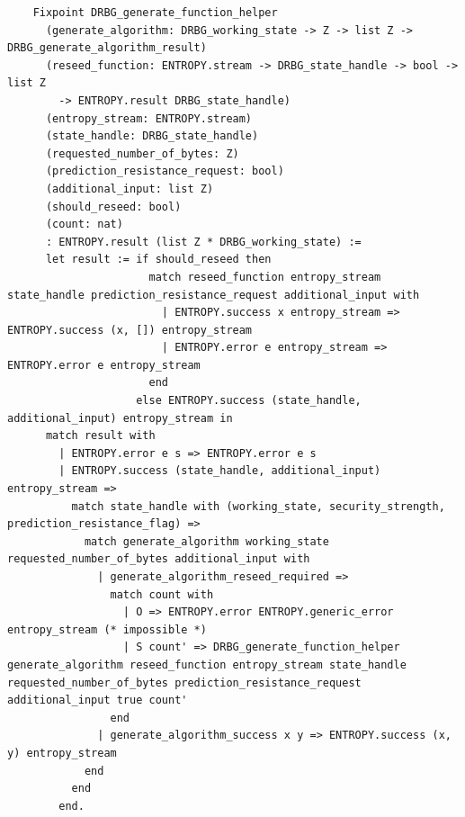 \documentclass[pageno]{jpaper}
\begin{document}
\begin{lstlisting}
    Fixpoint DRBG_generate_function_helper
      (generate_algorithm: DRBG_working_state -> Z -> list Z -> DRBG_generate_algorithm_result)
      (reseed_function: ENTROPY.stream -> DRBG_state_handle -> bool -> list Z
        -> ENTROPY.result DRBG_state_handle)
      (entropy_stream: ENTROPY.stream)
      (state_handle: DRBG_state_handle)
      (requested_number_of_bytes: Z)
      (prediction_resistance_request: bool)
      (additional_input: list Z)
      (should_reseed: bool)
      (count: nat)
      : ENTROPY.result (list Z * DRBG_working_state) :=
      let result := if should_reseed then
                      match reseed_function entropy_stream state_handle prediction_resistance_request additional_input with
                        | ENTROPY.success x entropy_stream => ENTROPY.success (x, []) entropy_stream
                        | ENTROPY.error e entropy_stream => ENTROPY.error e entropy_stream
                      end
                    else ENTROPY.success (state_handle, additional_input) entropy_stream in
      match result with
        | ENTROPY.error e s => ENTROPY.error e s
        | ENTROPY.success (state_handle, additional_input) entropy_stream =>
          match state_handle with (working_state, security_strength, prediction_resistance_flag) =>
            match generate_algorithm working_state requested_number_of_bytes additional_input with
              | generate_algorithm_reseed_required =>
                match count with
                  | O => ENTROPY.error ENTROPY.generic_error entropy_stream (* impossible *)
                  | S count' => DRBG_generate_function_helper generate_algorithm reseed_function entropy_stream state_handle requested_number_of_bytes prediction_resistance_request additional_input true count'
                end
              | generate_algorithm_success x y => ENTROPY.success (x, y) entropy_stream
            end
          end
        end.


\end{lstlisting}
\end{document}
